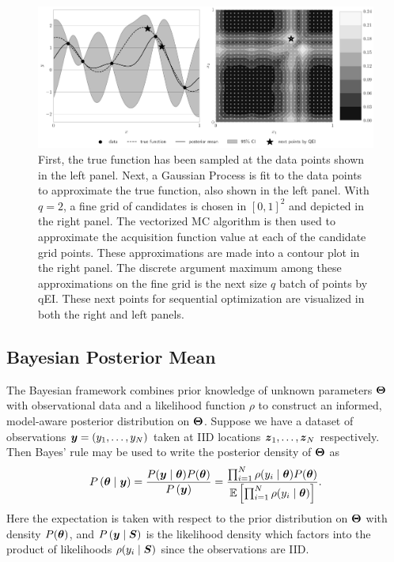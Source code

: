 \documentclass{article}[12pt]
\begin{document}
\begin{figure}[H]
    \centering
    \includegraphics[width=\textwidth]{figs/gp.pdf}
    \caption{First, the true function has been sampled at the data points shown in the left panel. Next, a Gaussian Process is fit to the data points to approximate the true function, also shown in the left panel. With $q=2$, a fine grid of candidates is chosen in $[0,1]^{2}$ and depicted in the right panel. The vectorized MC algorithm is then used to approximate the acquisition function value at each of the candidate grid points. These approximations are made into a contour plot in the right panel. The discrete argument maximum among these approximations on the fine grid is the next size $q$ batch of points by qEI. These next points for sequential optimization are visualized in both the right and left panels. }
    \label{fig:bo_qei}
\end{figure}

\subsection{Bayesian Posterior Mean}

The Bayesian framework combines prior knowledge of unknown parameters $\boldsymbol{\Theta}$ with observational data and a likelihood function $\rho$ to construct an informed, model-aware posterior distribution on $\boldsymbol{\Theta}$. Suppose we have a dataset of observations $\boldsymbol{y} = (y_1,\dots,y_{N})$ taken at IID locations $\boldsymbol{z}_1,\dots,\boldsymbol{z}_{N}$ respectively. Then Bayes' rule may be used to write the posterior density of $\boldsymbol{\Theta}$ as 
$$P\left(\boldsymbol{\theta} \mid \boldsymbol{y} \right) = \frac{P(\boldsymbol{y} \mid \boldsymbol{\theta}) P(\boldsymbol{\theta})}{P\left(\boldsymbol{y}\right)} = \frac{\prod_{i=1}^{N} \rho(y_i \mid \boldsymbol{\theta}) P(\boldsymbol{\theta})}{\mathbb{E}\left[\prod_{i=1}^{N} \rho(y_i \mid \boldsymbol{\theta})\right]}.$$
Here the expectation is taken with respect to the prior distribution on $\boldsymbol{\Theta}$ with density $P(\boldsymbol{\theta})$, and $P\left(\boldsymbol{y} \mid \boldsymbol{S} \right)$ is the likelihood density which factors into the product of likelihoods $\rho(y_i \mid \boldsymbol{S})$ since the observations are IID. 
\end{document}
